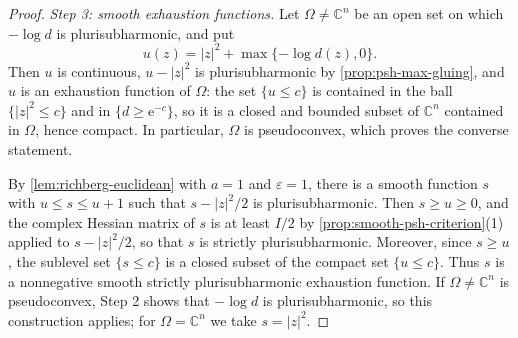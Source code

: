 \begin{proof}
\emph{Step 3: smooth exhaustion functions.} Let $\Omega\ne\mathbb C^n$ be an open set on which $-\log d$ is plurisubharmonic, and put
\[
 u(z)=|z|^2+\max\{-\log d(z),0\}.
\]
Then $u$ is continuous, $u-|z|^2$ is plurisubharmonic by \cref{prop:psh-max-gluing}, and $u$ is an exhaustion function of $\Omega$: the set $\{u\le c\}$ is contained in the ball $\{|z|^2\le c\}$ and in $\{d\ge\mathrm e^{-c}\}$, so it is a closed and bounded subset of $\mathbb C^n$ contained in $\Omega$, hence compact. In particular, $\Omega$ is pseudoconvex, which proves the converse statement.

By \cref{lem:richberg-euclidean} with $a=1$ and $\varepsilon=1$, there is a smooth function $s$ with $u\le s\le u+1$ such that $s-|z|^2/2$ is plurisubharmonic. Then $s\ge u\ge0$, and the complex Hessian matrix of $s$ is at least $I/2$ by \cref{prop:smooth-psh-criterion}(1) applied to $s-|z|^2/2$, so that $s$ is strictly plurisubharmonic. Moreover, since $s\ge u$, the sublevel set $\{s\le c\}$ is a closed subset of the compact set $\{u\le c\}$. Thus $s$ is a nonnegative smooth strictly plurisubharmonic exhaustion function. If $\Omega\ne\mathbb C^n$ is pseudoconvex, Step 2 shows that $-\log d$ is plurisubharmonic, so this construction applies; for $\Omega=\mathbb C^n$ we take $s=|z|^2$.
\end{proof}


